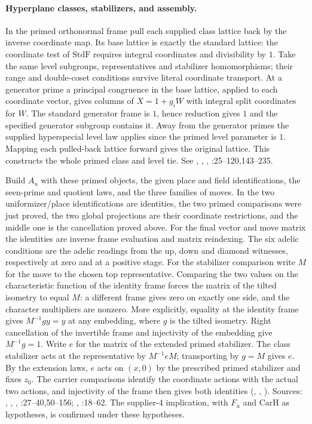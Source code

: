 \paragraph{Hyperplane classes, stabilizers, and assembly.}
In the primed orthonormal frame pull each supplied class lattice
back by the inverse coordinate map. Its base lattice is exactly the
standard lattice: the coordinate test of $\mathrm{StdF}$ requires
integral coordinates and divisibility by $1$. Take the same level
subgroups, representatives and stabilizer homomorphisms; their range
and double-coset conditions survive literal coordinate transport. At
a generator prime a principal congruence in the base lattice, applied
to each coordinate vector, gives columns of $X=1+g_iW$ with
integral split coordinates for $W$. The standard generator frame
is $1$, hence reduction gives $1$ and the specified generator subgroup
contains it. Away from the generator primes the supplied hyperspecial
level law applies since the primed level parameter is $1$. Mapping
each pulled-back lattice forward gives the original lattice. This constructs
the whole primed class and level tie.
See , , ,
:25--120,143--235.

Build $A_u$ with these primed objects, the given place and field
identifications, the seen-prime and quotient laws, and the three families
of moves. In  the two uniformizer/place identifications
are identities, the two primed comparisons were just proved, the two
global projections are their coordinate restrictions, and the middle
one is the cancellation proved above. For the final vector and move
matrix the identities are inverse frame evaluation and matrix reindexing.
The six adelic conditions are the adelic readings from the up, down and
diamond witnesses, respectively at zero and at a positive stage.
For the stabilizer comparison write $M$ for the move to the chosen
top representative. Comparing the two values on the characteristic
function of the identity frame forces the matrix of the tilted
isometry to equal $M$: a different frame gives zero on exactly one
side, and the character multipliers are nonzero. More explicitly, equality at the identity frame gives
$M^{-1}g y=y$ at any embedding, where $g$ is the tilted isometry.
Right cancellation of the invertible frame and injectivity of the
embedding give $M^{-1}g=1$. Write $e$ for the matrix of the extended
primed stabilizer. The class stabilizer acts at the representative by
$M^{-1}eM$; transporting by $g=M$ gives $e$. By the extension laws,
$e$ acts on $(x,0)$ by the prescribed primed stabilizer and fixes
$z_0$. The carrier comparisons identify the coordinate actions with the
actual two actions, and injectivity of the frame then gives both
identities (, , ).
Sources: , , ,
:27--40,50--156;
, :18--62.
The supplier-4 implication, with $F_u$ and $\mathrm{CarH}$ as hypotheses,
is confirmed under these hypotheses.

